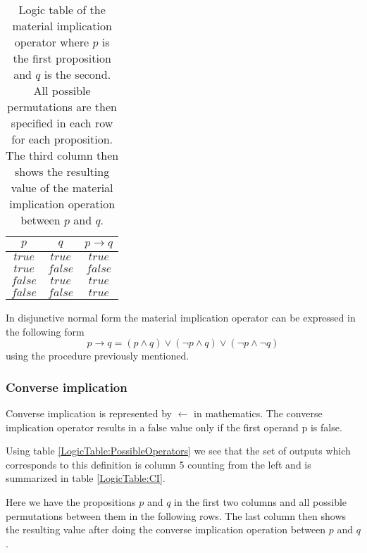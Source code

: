                 \begin{table}[h!]
                    \centering
                    \begin{tabular}{|c|c|c|}
                    	\hline
                    	  $p$   &   $q$   & $p \rightarrow q$ \\ \hline
                    	$true$  & $true$  &      $true$       \\ \hline
                    	$true$  & $false$ &      $false$      \\ \hline
                    	$false$ & $true$  &      $true$       \\ \hline
                    	$false$ & $false$ &      $true$       \\ \hline
                    \end{tabular}
                    \caption{Logic table of the material implication operator where $p$ is the first proposition and $q$ is the second. All possible permutations are then specified in each row for each proposition. The third column then shows the resulting value of the material implication operation between $p$ and $q$.}
                    \label{LogicTable:MI}
                \end{table}
            
                In disjunctive normal form the material implication operator can be expressed in the following form
                \begin{equation}
                p \rightarrow q = (p \wedge  q) \vee (\neg p \wedge q) \vee (\neg p \wedge \neg q)
                \end{equation}
                using the procedure previously mentioned.
            
            
            \subsubsection{Converse implication}
                Converse implication is represented by $\leftarrow$ in mathematics. The converse implication operator results in a false value only if the first operand p is false.
                
                Using table \ref{LogicTable:PossibleOperators} we see that the set of outputs which corresponds to this definition is column 5 counting from the left and is summarized in table \ref{LogicTable:CI}.
                
                Here we have the propositions $p$ and $q$ in the first two columns and all possible permutations between them in the following rows. The last column then shows the resulting value after doing the converse implication operation between $p$ and $q$.
                
